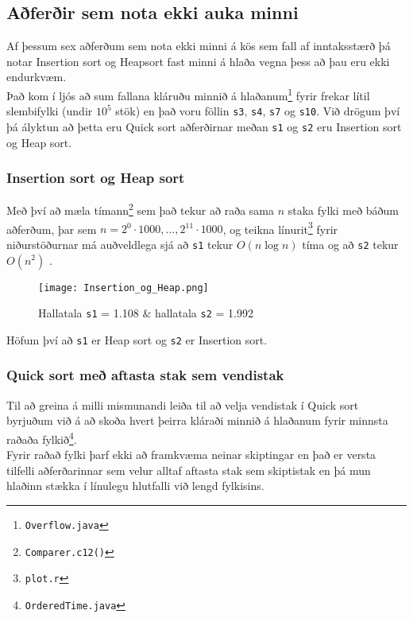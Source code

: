 \documentclass[a4paper,oneside]{article}
\begin{document}
\subsection{Aðferðir sem nota ekki auka minni}
\noindent Af þessum sex aðferðum sem nota ekki minni á kös sem fall af inntaksstærð þá notar Insertion sort og Heapsort fast minni á hlaða vegna þess að þau eru ekki endurkvæm. \\

\noindent Það kom í ljós að sum fallana kláruðu minnið á hlaðanum\footnote{\texttt{Overflow.java}} fyrir frekar lítil slembifylki (undir $10^5$ stök) en það voru föllin \texttt{s3}, \texttt{s4}, \texttt{s7} og \texttt{s10}. Við drögum því þá ályktun að þetta eru Quick sort aðferðirnar meðan \texttt{s1} og \texttt{s2} eru Insertion sort og Heap sort. \\

\subsubsection{Insertion sort og Heap sort}
Með því að mæla tímann\footnote{\texttt{Comparer.c12()}} sem það tekur að raða sama $n$ staka fylki með báðum aðferðum, þar sem $n = 2^0 \cdot 1000, ..., 2^{11} \cdot 1000$, og teikna línurit\footnote{\texttt{plot.r}} fyrir niðurstöðurnar má auðveldlega sjá að \texttt{s1} tekur $O(n \log n)$ tíma og að \texttt{s2} tekur $O(n^2)$ .\\

\begin{figure}[h!]
    \centering
    \texttt{[image: Insertion\_og\_Heap.png]}
    \caption{Hallatala \texttt{s1} = 1.108 \& hallatala \texttt{s2} = 1.992}
\end{figure}

\noindent Höfum því að \texttt{s1} er Heap sort og \texttt{s2} er Insertion sort.
 
\subsubsection{Quick sort með aftasta stak sem vendistak}
Til að greina á milli mismunandi leiða til að velja vendistak í Quick sort byrjuðum við á að skoða hvert þeirra kláraði minnið á hlaðanum fyrir minnsta raðaða fylkið\footnote{\texttt{OrderedTime.java}}. \\

\noindent Fyrir raðað fylki þarf ekki að framkvæma neinar skiptingar en það er versta tilfelli aðferðarinnar sem velur alltaf aftasta stak sem skiptistak en þá mun hlaðinn stækka í línulegu hlutfalli við lengd fylkisins. \\
\end{document}
